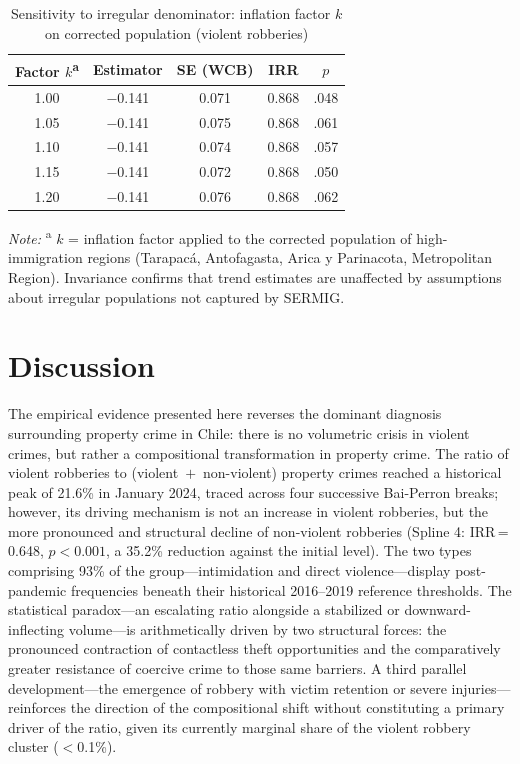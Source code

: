 \documentclass[pdflatex,sn-basic]{sn-jnl}
\newcommand{\tablenote}[1]{%
  \vspace{2pt}%
  {\par\footnotesize\textit{Note:} #1\par}%
}
\begin{document}
\begin{table}[htbp]
\centering
\caption{Sensitivity to irregular denominator: inflation factor $k$ on corrected population (violent robberies)}
\label{tab:sensipop}
\footnotesize
\begin{tabular}{ccccc}
\toprule
\textbf{Factor $k$}\textsuperscript{a} & \textbf{Estimator} & \textbf{SE (WCB)} & \textbf{IRR} & $p$ \\
\midrule
1.00 & $-$0.141 & 0.071 & 0.868 & .048 \\
1.05 & $-$0.141 & 0.075 & 0.868 & .061 \\
1.10 & $-$0.141 & 0.074 & 0.868 & .057 \\
1.15 & $-$0.141 & 0.072 & 0.868 & .050 \\
1.20 & $-$0.141 & 0.076 & 0.868 & .062 \\
\bottomrule
\end{tabular}
\tablenote{\textsuperscript{a} $k$ = inflation factor applied to the corrected population of high-immigration regions (Tarapac\'a, Antofagasta, Arica y Parinacota, Metropolitan Region). Invariance confirms that trend estimates are unaffected by assumptions about irregular populations not captured by SERMIG.}
\end{table}

\section{Discussion}
\label{sec:discusion}

The empirical evidence presented here reverses the dominant diagnosis surrounding property crime in Chile: there is no volumetric crisis in violent crimes, but rather a compositional transformation in property crime. The ratio of violent robberies to (violent~$+$~non-violent) property crimes reached a historical peak of 21.6\% in January 2024, traced across four successive Bai-Perron breaks; however, its driving mechanism is not an increase in violent robberies, but the more pronounced and structural decline of non-violent robberies (Spline 4: IRR\,=\,0.648, $p<0.001$, a 35.2\% reduction against the initial level). The two types comprising 93\% of the group---intimidation and direct violence---display post-pandemic frequencies beneath their historical 2016--2019 reference thresholds. The statistical paradox---an escalating ratio alongside a stabilized or downward-inflecting volume---is arithmetically driven by two structural forces: the pronounced contraction of contactless theft opportunities and the comparatively greater resistance of coercive crime to those same barriers. A third parallel development---the emergence of robbery with victim retention or severe injuries---reinforces the direction of the compositional shift without constituting a primary driver of the ratio, given its currently marginal share of the violent robbery cluster ($<$0.1\%).
\end{document}
